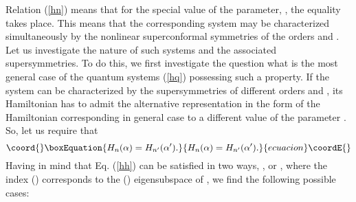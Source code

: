 \documentclass[a4paper,12pt]{article}
\begin{document}
Relation (\ref{hn}) means that for the special value of the
parameter, \coordHE{}, the equality \coordHE{}
takes place.
This means that the corresponding system
may be characterized simultaneously by the nonlinear
superconformal symmetries of the orders \coordHE{} and \coordHE{}.
Let us investigate the nature of such systems
and the associated supersymmetries.
To do this, we first investigate the question
what is the most general case of the quantum systems
(\ref{hq}) possessing such a property.
If the system can be characterized by the supersymmetries
of different orders \coordHE{} and \coordHE{},
its Hamiltonian \coordHE{} has to admit
the alternative representation in the form
of the Hamiltonian \coordHE{} corresponding
in general case to a different value of the
parameter \myHighlight{$\alpha$}\coordHE{}.
So, let us require that
\begin{equation}\coord{}\boxEquation{
H_n(\alpha)=H_{n'}(\alpha ').
\label{hh}
}{
H_n(\alpha)=H_{n'}(\alpha ').
}{ecuacion}\coordE{}\end{equation}
Having in mind that Eq. (\ref{hh})
can be satisfied in two ways,
\coordHE{},
or
\coordHE{},
where the index \myHighlight{$+$}\coordHE{} (\myHighlight{$-$}\coordHE{}) corresponds to the \coordHE{}
(\coordHE{}) eigensubspace of \coordHE{},
we find the following possible cases:
\end{document}

